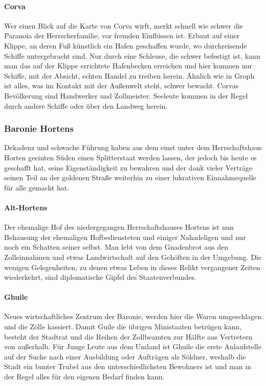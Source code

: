 \documentclass[a4paper,12pt,oneside]{book}
\begin{document}
\paragraph{Corva}
Wer einen Blick auf die Karte von Corva wirft, merkt schnell wie schwer die Paranoia der Herrscherfamilie, vor fremden Einflüssen ist. Erbaut auf einer Klippe, an deren Fuß künstlich ein Hafen geschaffen wurde, wo durchreisende Schiffe untergebracht sind. Nur durch eine Schleuse, die schwer befestigt ist, kann man das auf der Klippe errichtete Hafenbecken erreichen und hier kommen nur Schiffe, mit der Absicht, echten Handel zu treiben herein. Ähnlich wie in Groph ist alles, was im Kontakt mit der Außenwelt steht, schwer bewacht. Corvas Bevölkerung sind Handwerker und Zollmeister. Seeleute kommen in der Regel durch andere Schiffe oder über den Landweg herein.

\subsubsection{Baronie Hortens}
Dekadenz und schwache Führung haben aus dem einst unter dem Herrschaftshaus Horten geeinten Süden einen Splitterstaat werden lassen, der jedoch bis heute es geschafft hat, seine Eigenständigkeit zu bewahren und der dank vieler Verträge seinen Teil an der goldenen Straße weiterhin zu einer lukrativen Einnahmequelle für alle gemacht hat. 
\paragraph{Alt-Hortens}
Der ehemalige Hof des niedergegangen Herrschaftshauses Hortens ist nun Behausung der ehemaligen Hofbediensteten und einiger Nahadeligen und nur noch ein Schatten seiner selbst. Man lebt von dem Gnadenbrot aus den Zolleinnahmen und etwas Landwirtschaft auf den Gehöften in der Umgebung. Die wenigen Gelegenheiten, zu denen etwas Leben in dieses Relikt vergangener Zeiten wiederkehrt, sind diplomatische Gipfel des Staatenverbundes.
\paragraph{Ghuile}
Neues wirtschaftliches Zentrum der Baronie, werden hier die Waren umgeschlagen und die Zölle kassiert. Damit Guile die übrigen Ministaaten betrügen kann, besteht der Stadtrat und die Reihen der Zollbeamten zur Hälfte aus Vertretern von außerhalb. Für Junge Leute aus dem Umland ist Ghuile die erste Anlaufstelle auf der Suche nach einer Ausbildung oder Aufträgen als Söldner, weshalb die Stadt ein bunter Trubel aus den unterschiedlichsten Bewohners ist und man in der Regel alles für den eigenen Bedarf finden kann. 
\end{document}
